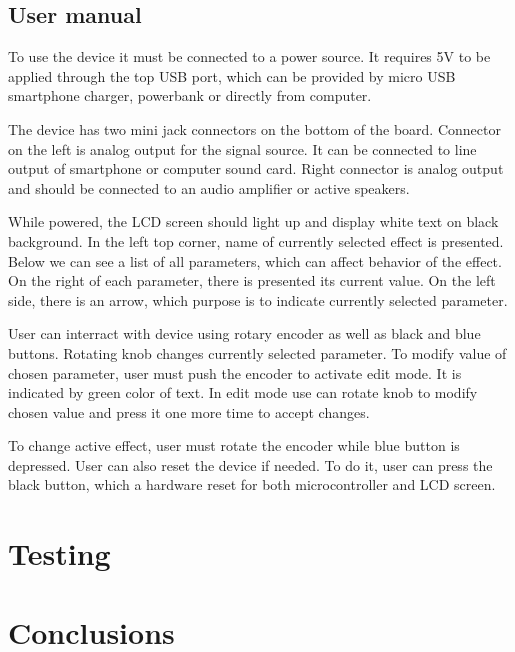 \documentclass[a4paper,twoside,12pt]{book}
\newcounter{PagesWithoutNumbers}
\begin{document}
\section{User manual}
To use the device it must be connected to a power source.
It requires 5V to be applied through the top USB port,
which can be provided by micro USB smartphone charger,
powerbank or directly from computer.

The device has two mini jack connectors on the bottom of the board.
Connector on the left is analog output for the signal source.
It can be connected to line output of smartphone or computer sound card.
Right connector is analog output and should be connected
to an audio amplifier or active speakers.

While powered, the LCD screen should light up
and display white text on black background.
In the left top corner, name of currently selected effect is presented.
Below we can see a list of all parameters,
which can affect behavior of the effect.
On the right of each parameter, there is presented its current value.
On the left side, there is an arrow,
which purpose is to indicate currently selected parameter.

User can interract with device using rotary encoder
as well as black and blue buttons.
Rotating knob changes currently selected parameter.
To modify value of chosen parameter, user must push the encoder
to activate edit mode. It is indicated by green color of text.
In edit mode use can rotate knob to modify chosen value
and press it one more time to accept changes.

To change active effect, user must rotate the encoder
while blue button is depressed. User can also reset the device if needed.
To do it, user can press the black button,
which a hardware reset for both microcontroller and LCD screen.

\newpage



\chapter{Testing}

\newpage


\chapter{Conclusions}

\newpage

\backmatter
{}
\setcounter{page}{\value{PagesWithoutNumbers}}
\end{document}
